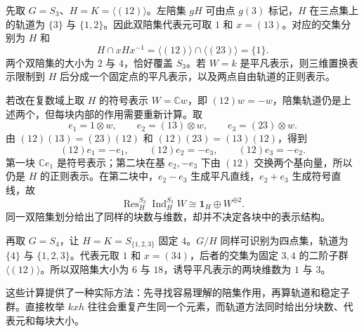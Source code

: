 先取 \(G=S_3\)、\(H=K=\bigl\langle(12)\bigr\rangle\)。左陪集 \(gH\) 可由点 \(g(3)\) 标记，\(H\) 在三点集上的轨道为 \(\{3\}\) 与 \(\{1,2\}\)。因此双陪集代表元可取 \(1\) 和 \(x=(13)\)。对应的交集分别为 \(H\) 和
\[
	H\cap xHx^{-1}=\bigl\langle(12)\bigr\rangle\cap\bigl\langle(23)\bigr\rangle=\{1\}.
\]
两个双陪集的大小为 \(2\) 与 \(4\)，恰好覆盖 \(S_3\)。若 \(W=k\) 是平凡表示，则三维置换表示限制到 \(H\) 后分成一个固定点的平凡表示，以及两点自由轨道的正则表示。

\ProseParagraphBreak

若改在复数域上取 \(H\) 的符号表示 \(W=\mathbb Cw\)，即 \((12)w=-w\)，陪集轨道仍是上述两个，但每块内部的作用需要重新计算。取
\[
	e_1=1\otimes w,\qquad e_2=(13)\otimes w,\qquad e_3=(23)\otimes w.
\]
由 \((12)(13)=(23)(12)\) 和 \((12)(23)=(13)(12)\)，得到
\[
	(12)e_1=-e_1,\qquad (12)e_2=-e_3,\qquad (12)e_3=-e_2.
\]
第一块 \(\mathbb Ce_1\) 是符号表示；第二块在基 \(e_2,-e_3\) 下由 \((12)\) 交换两个基向量，所以仍是 \(H\) 的正则表示。在第二块中，\(e_2-e_3\) 生成平凡直线，\(e_2+e_3\) 生成符号直线，故
\[
	\operatorname{Res}_H^{S_3}\operatorname{Ind}_H^{S_3}W \cong \mathbf1_H\oplus W^{\oplus2}.
\]
同一双陪集划分给出了同样的块数与维数，却并不决定各块中的表示结构。

\ProseParagraphBreak

再取 \(G=S_4\)，让 \(H=K=S_{\{1,2,3\}}\) 固定 \(4\)。\(G/H\) 同样可识别为四点集，轨道为 \(\{4\}\) 与 \(\{1,2,3\}\)。代表元取 \(1\) 和 \(x=(34)\)，后者的交集为固定 \(3,4\) 的二阶子群 \(\bigl\langle(12)\bigr\rangle\)。所以双陪集大小为 \(6\) 与 \(18\)，诱导平凡表示的两块维数为 \(1\) 与 \(3\)。

\ProseParagraphBreak

这些计算提供了一种实际方法：先寻找容易理解的陪集作用，再算轨道和稳定子群。直接枚举 \(kxh\) 往往会重复产生同一个元素，而轨道方法同时给出分块数、代表元和每块大小。
